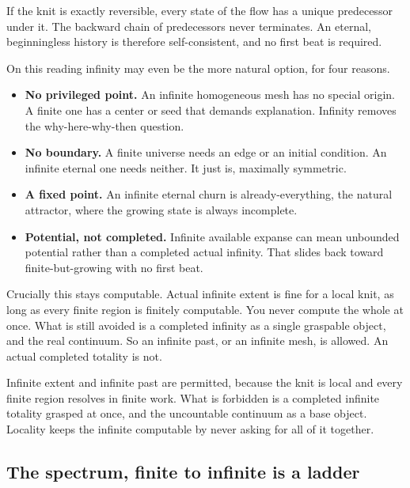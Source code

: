 \begin{theorem}
If the knit is exactly reversible, every state of the flow has a unique predecessor under it. The backward chain of predecessors never terminates. An eternal, beginningless history is therefore self-consistent, and no first beat is required.
\end{theorem}

On this reading infinity may even be the more natural option, for four reasons.

\begin{itemize}
\item \textbf{No privileged point.} An infinite homogeneous mesh has no special origin. A finite one has a center or seed that demands explanation. Infinity removes the why-here-why-then question.
\item \textbf{No boundary.} A finite universe needs an edge or an initial condition. An infinite eternal one needs neither. It just is, maximally symmetric.
\item \textbf{A fixed point.} An infinite eternal churn is already-everything, the natural attractor, where the growing state is always incomplete.
\item \textbf{Potential, not completed.} Infinite available expanse can mean unbounded potential rather than a completed actual infinity. That slides back toward finite-but-growing with no first beat.
\end{itemize}

Crucially this stays computable. Actual infinite extent is fine for a local knit, as long as every finite region is finitely computable. You never compute the whole at once. What is still avoided is a completed infinity as a single graspable object, and the real continuum. So an infinite past, or an infinite mesh, is allowed. An actual completed totality is not.

\begin{principle}
Infinite extent and infinite past are permitted, because the knit is local and every finite region resolves in finite work. What is forbidden is a completed infinite totality grasped at once, and the uncountable continuum as a base object. Locality keeps the infinite computable by never asking for all of it together.
\end{principle}

\subsection{The spectrum, finite to infinite is a ladder}

